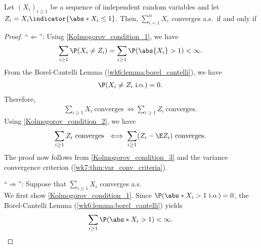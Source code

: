 \documentclass[../aipt.tex]{subfiles}
\begin{document}
\begin{Theorem} \label{Kolmogorov_Three_Series_Thm}
Let $(X_i)_{i\geq1}$ be a sequence of independent random variables and let $Z_i = X_i \indicator{\abs*{X_i} \leq 1}$. Then, $\sum_{i=1}^n X_i$ converges a.s.\ if and only if
\end{Theorem}
%
\begin{proof}
``$\Leftarrow$'': Using \cref{Kolmogorov_condition_1}, we have
\begin{align*}
\sum_{i \geq 1} \P(X_i \neq Z_i) = \sum_{i \geq 1} \P(\abs{X_i} > 1) < \infty.
\end{align*}
From the Borel-Cantelli Lemma (\cref{wk6:lemma:borel_cantelli}), we have 
\begin{align*}
\P(X_i \neq Z_i\ \text{i.o.}) = 0.
\end{align*}
Therefore, 
\begin{align*}
\sum_{i \geq 1} X_i \ \text{converges}\
\iff
\sum_{i \geq 1} Z_i \ \text{converges}.
\end{align*}
Using \cref{Kolmogorov_condition_2}, we have
\begin{align*}
\sum_{i \geq 1} Z_i \ \text{converges}\ 
\iff
\sum_{i \geq 1} (Z_i - \E Z_i) \ \text{converges}.
\end{align*}
The proof now follows from \cref{Kolmogorov_condition_3} and the variance convergence criterion (\cref{wk7:thm:var_conv_criteria}).

``$\Rightarrow$'': Suppose that $\sum_{i \geq 1} X_i$ converges a.s.\\
We first show \cref{Kolmogorov_condition_1}. Since $\P(\abs*{X_i} > 1 \io) = 0$, the Borel-Cantelli Lemma (\cref{wk6:lemma:borel_cantelli}) yields 
\begin{align*}
\sum_{i \geq 1} \P(\abs*{X_i} > 1) < \infty. 
\end{align*}



\end{proof}
\end{document}
